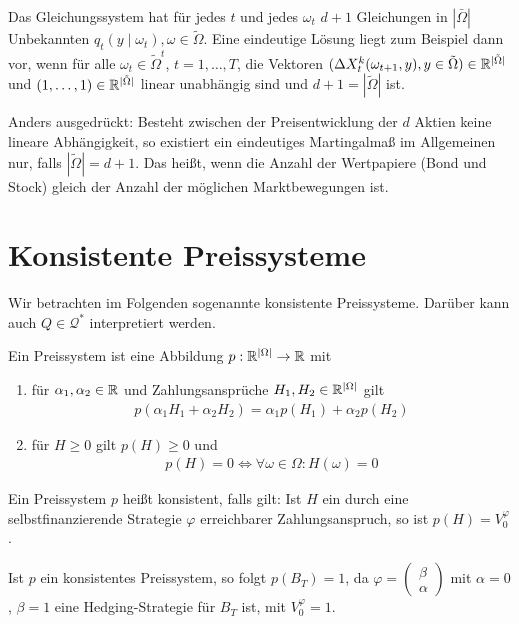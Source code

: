 \documentclass[a4paper,twoside,DIV15,BCOR12mm]{scrbook}
\begin{document}
\begin{bemerkung}
Das Gleichungssystem hat für jedes $t$ und jedes $\omega_t$ $d+1$ Gleichungen in $|\bar\Omega|$ Unbekannten $q_t(y\mid \omega_t),\omega\in \tilde\Omega$. Eine eindeutige Lösung liegt zum Beispiel dann vor, wenn für alle $\omega_t\in \tilde\Omega^t$, $t=1,\ldots,T$, die Vektoren $(\Delta X_t^k(\omega_{t+1},y), y\in \tilde\Omega)\in \mathbb{R}^{|\tilde\Omega|}$ und $(1,\ldots,1)\in\mathbb{R}^{|\tilde\Omega|}$ linear unabhängig sind und $d+1=|\tilde\Omega|$ ist.

Anders ausgedrückt: Besteht zwischen der Preisentwicklung der $d$ Aktien keine lineare Abhängigkeit, so existiert ein eindeutiges Martingalmaß im Allgemeinen nur, falls $|\tilde\Omega|=d+1$. Das heißt, wenn die Anzahl der Wertpapiere (Bond und Stock) gleich der Anzahl der möglichen Marktbewegungen ist.
\end{bemerkung}

\section{Konsistente Preissysteme}

Wir betrachten im Folgenden sogenannte konsistente Preissysteme. Darüber kann auch $Q\in \mathcal Q^*$ interpretiert werden.

\begin{definition}
Ein Preissystem ist eine Abbildung $p:\mathbb{R}^{|\Omega|} \to \mathbb{R}$ mit
\begin{enumerate}
\item für $\alpha_1,\alpha_2\in \mathbb{R}$ und Zahlungsansprüche $H_1,H_2\in \mathbb{R}^{|\Omega|}$ gilt
\begin{align*}
p(\alpha_1H_1+\alpha_2H_2) = \alpha_1p(H_1) + \alpha_2p(H_2) \tag{„Linearität“}
\end{align*}
\item für $H\ge 0$ gilt $p(H) \ge 0$ und
\begin{align*}
p(H) = 0 \iff \forall \omega\in \Omega: H(\omega) = 0 \tag{„Positivität“}
\end{align*}
\end{enumerate}
Ein Preissystem $p$ heißt konsistent, falls gilt: Ist $H$ ein durch eine selbstfinanzierende Strategie $\varphi$ erreichbarer Zahlungsanspruch, so ist $p(H) = V_0^\varphi$.
\end{definition}

\begin{bemerkung}
Ist $p$ ein konsistentes Preissystem, so folgt $p(B_T)=1$, da 
$\varphi=\left(\begin{smallmatrix} \beta \\ \alpha \end{smallmatrix}\right)$
mit $\alpha=0$, $\beta=1$ eine Hedging-Strategie für $B_T$ ist, mit $V_0^\varphi =1$.
\end{bemerkung}
\end{document}
